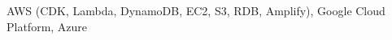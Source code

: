 \skillcategory{}{}
 AWS (CDK, Lambda, DynamoDB, EC2, S3, RDB, Amplify), Google Cloud Platform, Azure\\
